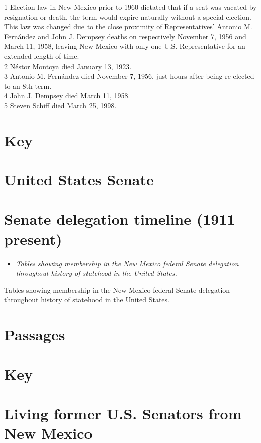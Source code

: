 1 Election law in New Mexico prior to 1960 dictated that if a seat was
vacated by resignation or death, the term would expire naturally without
a special election. This law was changed due to the close proximity of
Representatives' Antonio M. Fernández and John J. Dempsey deaths on
respectively November 7, 1956 and March 11, 1958, leaving New Mexico
with only one U.S. Representative for an extended length of time.\\
2 Néstor Montoya died January 13, 1923.\\
3 Antonio M. Fernández died November 7, 1956, just hours after being
re-elected to an 8th term.\\
4 John J. Dempsey died March 11, 1958.\\
5 Steven Schiff died March 25, 1998.

\section{Key}\label{key}

\section{United States Senate}\label{united-states-senate}

\section{Senate delegation timeline
(1911--present)}\label{senate-delegation-timeline-1911present}

\begin{itemize}
\item
  \emph{Tables showing membership in the New Mexico federal Senate
  delegation throughout history of statehood in the United States.}
\end{itemize}

Tables showing membership in the New Mexico federal Senate delegation
throughout history of statehood in the United States.

\section{Passages}\label{passages}

\section{Key}\label{key-1}

\section{Living former U.S. Senators from New
Mexico}\label{living-former-u.s.-senators-from-new-mexico}

